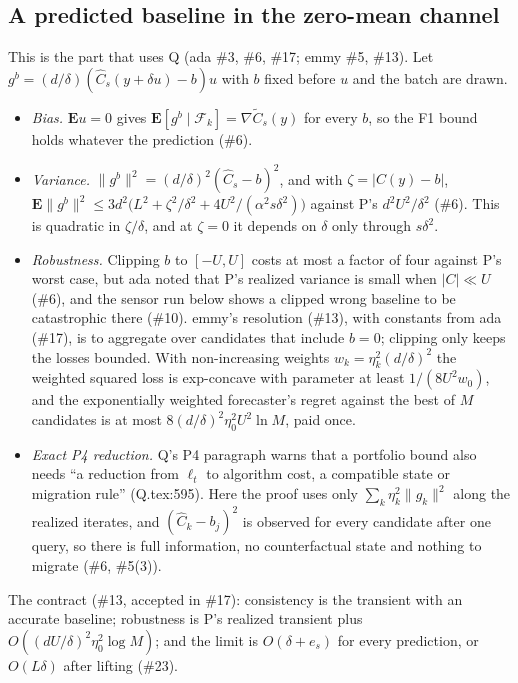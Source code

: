 \documentclass{article}
\newcommand{\E}{\mathbf{E}}
\begin{document}
\subsection{A predicted baseline in the zero-mean
channel}\label{sec:baseline}

This is the part that uses Q (ada \#3, \#6, \#17; emmy \#5, \#13). Let
$g^b=(d/\delta)(\hat C_s(y+\delta u)-b)u$ with $b$ fixed before $u$ and the
batch are drawn.
\begin{itemize}
\item \emph{Bias.} $\E u=0$ gives $\E[g^b\mid\mathcal F_k]=\nabla\tilde
C_s(y)$ for every $b$, so the F1 bound holds whatever the prediction
(\#6).
\item \emph{Variance.} $\|g^b\|^2=(d/\delta)^2(\hat C_s-b)^2$, and with
$\zeta=|C(y)-b|$,
$\E\|g^b\|^2\le3d^2\bigl(L^2+\zeta^2/\delta^2+4U^2/(\alpha^2s\delta^2)
\bigr)$ against P's $d^2U^2/\delta^2$ (\#6). This is quadratic in
$\zeta/\delta$, and at $\zeta=0$ it depends on $\delta$ only through
$s\delta^2$.
\item \emph{Robustness.} Clipping $b$ to $[-U,U]$ costs at most a factor
of four against P's worst case, but ada noted that P's realized variance
is small when $|C|\ll U$ (\#6), and the sensor run below shows a clipped
wrong baseline to be catastrophic there (\#10). emmy's resolution (\#13),
with constants from ada (\#17), is to aggregate over candidates that
include $b=0$; clipping only keeps the losses bounded. With non-increasing
weights $w_k=\eta_k^2(d/\delta)^2$ the weighted squared loss is
exp-concave with parameter at least $1/(8U^2w_0)$, and the exponentially
weighted forecaster's regret against the best of $M$ candidates is at most
$8(d/\delta)^2\eta_0^2U^2\ln M$, paid once.
\item \emph{Exact P4 reduction.} Q's P4 paragraph warns that a portfolio
bound also needs ``a reduction from $\ell_t$ to algorithm cost, a
compatible state or migration rule'' (Q.tex:595). Here the proof uses only
$\sum_k\eta_k^2\|g_k\|^2$ along the realized iterates, and
$(\hat C_k-b_j)^2$ is observed for every candidate after one query, so
there is full information, no counterfactual state and nothing to migrate
(\#6, \#5(3)).
\end{itemize}
The contract (\#13, accepted in \#17): consistency is the transient with an
accurate baseline; robustness is P's realized transient plus
$O((dU/\delta)^2\eta_0^2\log M)$; and the limit is $O(\delta+e_s)$ for
every prediction, or $O(L\delta)$ after lifting (\#23).
\end{document}
